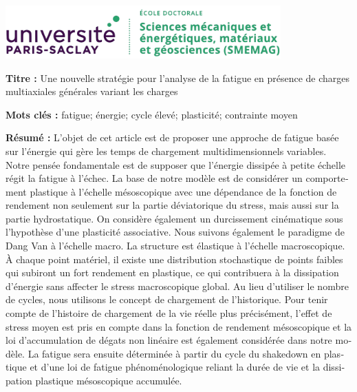 \pagestyle{empty}

\begin{flushleft}
\includegraphics[width=300pt]{figures/SMEMAG.png}

\vspace{20pt}

\begin{mdframed}
\begin{otherlanguage}{french}
\textbf{Titre :} Une nouvelle stratégie pour l'analyse de la fatigue en présence de charges multiaxiales générales variant les charges

\textbf{Mots clés :} fatigue; énergie; cycle élevé; plasticité; contrainte moyen

\textbf{Résumé :} L'objet de cet article est de proposer une approche de fatigue basée sur l'énergie qui gère les temps de chargement multidimensionnels variables. Notre pensée fondamentale est de supposer que l'énergie dissipée à petite échelle régit la fatigue à l'échec. La base de notre modèle est de considérer un comportement plastique à l'échelle mésoscopique avec une dépendance de la fonction de rendement non seulement sur la partie déviatorique du stress, mais aussi sur la partie hydrostatique. On considère également un durcissement cinématique sous l'hypothèse d'une plasticité associative. Nous suivons également le paradigme de Dang Van à l'échelle macro. La structure est élastique à l'échelle macroscopique. À chaque point matériel, il existe une distribution stochastique de points faibles qui subiront un fort rendement en plastique, ce qui contribuera à la dissipation d'énergie sans affecter le stress macroscopique global. Au lieu d'utiliser le nombre de cycles, nous utilisons le concept de chargement de l'historique. Pour tenir compte de l'histoire de chargement de la vie réelle plus précisément, l'effet de stress moyen est pris en compte dans la fonction de rendement mésoscopique et la loi d'accumulation de dégats non linéaire est également considérée dans notre modèle. La fatigue sera ensuite déterminée à partir du cycle du shakedown en plastique et d'une loi de fatigue phénoménologique reliant la durée de vie et la dissipation plastique mésoscopique accumulée.

\end{otherlanguage}
\end{mdframed}


\end{flushleft}
